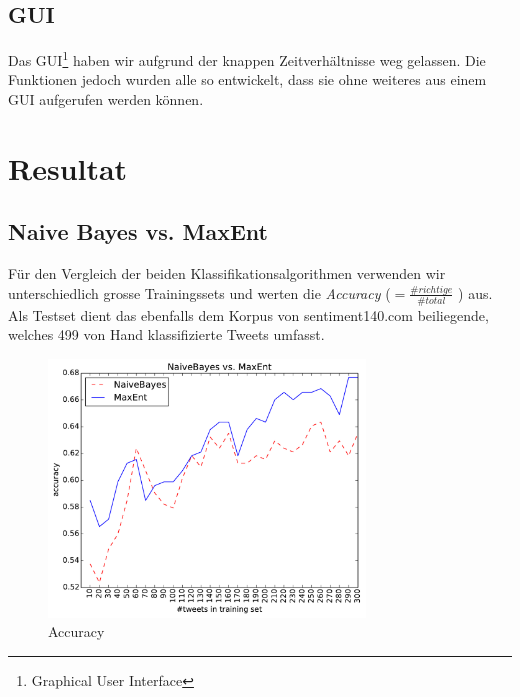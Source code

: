 \documentclass[12pt, oneside]{report}   	%
\begin{document}
\section{GUI}
Das GUI\footnote{Graphical User Interface} haben wir aufgrund der knappen Zeitverhältnisse weg gelassen. Die Funktionen jedoch wurden alle so entwickelt, dass sie ohne weiteres aus einem GUI aufgerufen werden können.


\chapter{Resultat}

\section{Naive Bayes vs. MaxEnt}

Für den Vergleich der beiden Klassifikationsalgorithmen verwenden wir unterschiedlich grosse Trainingssets und werten die \emph{Accuracy} ($= \frac{\#richtige}{\#total}$ ) aus. 
Als Testset dient das ebenfalls dem Korpus von sentiment140.com beiliegende, welches 499 von Hand klassifizierte Tweets umfasst.

\begin{figure}[htbp]
\begin{center}
\includegraphics[width=0.75\textwidth]{bilder/cmp_nb_vs_me_S10_M300-16M.pdf}
\caption{Accuracy}
\label{img:acc}
\end{center}
\end{figure}
\end{document}
